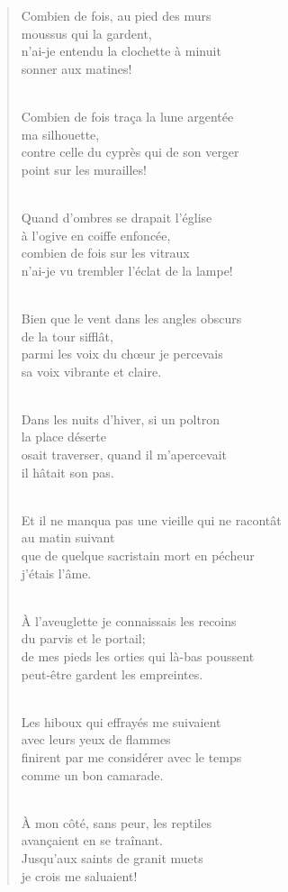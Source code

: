 \documentclass[a4paper,12pt]{book}
\begin{document}
\begin{verse}
Combien de fois, au pied des murs \\
moussus qui la gardent, \\
n'ai-je entendu la clochette à minuit \\
sonner aux matines! \\ \

Combien de fois tra\c{c}a la lune argentée \\
ma silhouette, \\
contre celle du cyprès qui de son verger \\
point sur les murailles! \\ \

Quand d'ombres se drapait l'église \\
à l'ogive en coiffe enfoncée, \\
combien de fois sur les vitraux \\
n'ai-je vu trembler l'éclat de la lampe! \\ \

Bien que le vent dans les angles obscurs \\
de la tour sifflât, \\
parmi les voix du ch{\oe}ur je percevais \\
sa voix vibrante et claire. \\ \

Dans les nuits d'hiver, si un poltron \\
la place déserte \\
osait traverser, quand il m'apercevait \\
il hâtait son pas. \\ \

Et il ne manqua pas une vieille qui ne racontât \\
au matin suivant \\
que de quelque sacristain mort en pécheur \\
j'étais l'âme. \\ \

À l'aveuglette je connaissais les recoins \\
du parvis et le portail; \\
de mes pieds les orties qui là-bas poussent \\
peut-être gardent les empreintes. \\ \

Les hiboux qui effrayés me suivaient \\
avec leurs yeux de flammes \\
finirent par me considérer avec le temps \\
comme un bon camarade. \\ \

À mon côté, sans peur, les reptiles \\
avan\c{c}aient en se traînant. \\
Jusqu'aux saints de granit muets \\
je crois me saluaient! \\
\end{verse}
\end{document}
